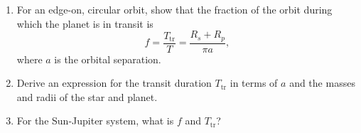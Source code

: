 \begin{exercisebox}
\begin{enumerate}\renewcommand{\labelenumi}{\alph{enumi})}
\item\label{e.transit-fraction}
For an edge-on, circular orbit, show that the fraction of the orbit during which the planet is in transit is
\[ f = \frac{T_{\mathrm{tr}}}{T} = \frac{R_{s}+R_{p}}{\pi a}, \]
where $a$ is the orbital separation.

\item\label{e.transit-duration}
Derive an expression for the transit duration $T_{\mathrm{tr}}$ in terms of $a$ and the masses and radii of the star and planet.

\item\label{e.transit-properties-jupiter}
For the Sun-Jupiter system, what is $f$ and $T_{\mathrm{tr}}$?

\end{enumerate}
\end{exercisebox}

